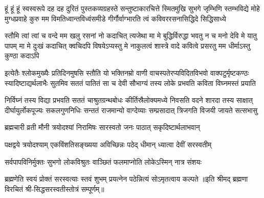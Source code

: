 \fourlineindentedshloka
{हूं हूं हूं स्वस्वरूपे दह दह दुरितं पुस्तकव्यग्रहस्ते}
{सन्तुष्टाकारचित्ते स्मितमुखि सुभगे जृम्भिणि स्तम्भविद्ये}
{मोहे मुग्धप्रवाहे कुरु मम विमतिध्वान्तविध्वंसमीडे}
{गीर्गौर्वाग्भारति त्वं कविवररसनासिद्धिदे सिद्धिसाध्ये}

\fourlineindentedshloka
{स्तौमि त्वां त्वां च वन्दे मम खलु रसनां नो कदाचित् त्यजेथा}
{मा मे बुद्धिर्विरुद्धा भवतु न च मनो देवि मे यातु पापम्}
{मा मे दुःखं कदाचित् क्वचिदपि विषयेऽप्यस्तु मे नाकुलत्वं}
{शास्त्रे वादे कवित्वे प्रसरतु मम धीर्माऽस्तु कुण्ठा कदाऽपि}


\fourlineindentedshloka
{इत्येतैः श्लोकमुख्यैः प्रतिदिनमुषसि स्तौति यो भक्तिनम्रो}
{वाणी वाचस्पतेरप्यविदितविभवो वाक्पटुर्मृष्टकण्ठः}
{स्यादिष्टाद्यर्थलाभैः सुतमिव सततं पातितं सा च देवी}
{सौभाग्यं तस्य लोके प्रभवति कविता विघ्नमस्तं प्रयाति}

\fourlineindentedshloka
{निर्विघ्नं तस्य विद्या प्रभवति सततं चाश्रुतग्रन्थबोधः}
{कीर्तिस्रैलोक्यमध्ये निवसति वदने शारदा तस्य साक्षात्}
{दीर्घायुर्लोकपूज्यः सकलगुणनिधिः सन्ततं राजमान्यो}
{वाग्देव्याः सम्प्रसादात् त्रिजगति विजयी जायते सत्सभासु}

\twolineshloka
{ब्रह्मचारी व्रती मौनी त्रयोदश्यां निरामिषः}
{सारस्वतो जनः पाठात् सकृदिष्टार्थलाभवान्}

\twolineshloka
{पक्षद्वये त्रयोदश्याम् एकविंशतिसङ्ख्यया}
{अविच्छिन्नः पठेद् धीमान् ध्यात्वा देवीं सरस्वतीम्}

\twolineshloka
{सर्वपापविनिर्मुक्तः सुभगो लोकविश्रुतः}
{वाञ्छितं फलमाप्नोति लोकेऽस्मिन् नात्र संशयः}

\twolineshloka
{ब्रह्मणेति स्वयं प्रोक्तं सरस्वत्याः स्तवं शुभम्}
{प्रयत्नेन पठेन्नित्यं सोऽमृतत्वाय कल्पते}
॥इति श्रीमद् ब्रह्मणा विरचितं श्री-सिद्धसरस्वतीस्तोत्रं सम्पूर्णम्॥
\setlength{\shlokaspaceskip}{24pt}